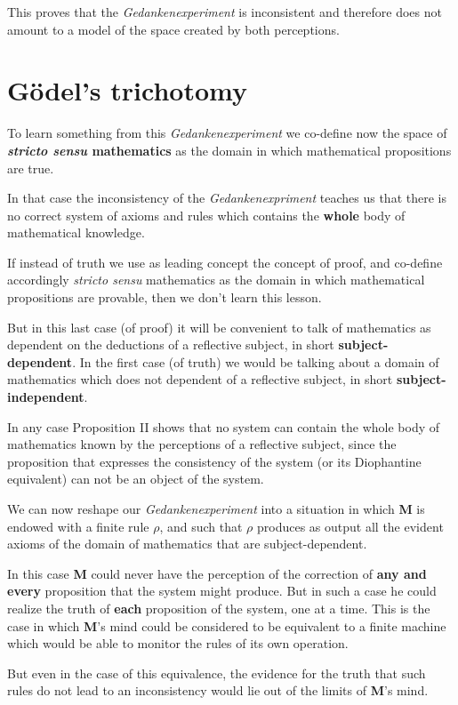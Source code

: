 \documentclass[12pt]{article}
\begin{document}
This proves that the \emph{Gedankenexperiment} is inconsistent and therefore does not amount to a model of the space created by both perceptions.

\section{G\"{o}del's trichotomy}

To learn something from this \emph{Gedankenexperiment} we co-define now the space of \textbf{\emph{stricto sensu} mathematics} as the domain in which mathematical propositions are true.

In that case the inconsistency of the \emph{Gedankenexpriment} teaches us that there is no correct system of axioms and rules which contains the \textbf{whole} body of mathematical knowledge.

If instead of truth we use as leading concept the concept of proof, and co-define accordingly \emph{stricto sensu} mathematics as the domain in which mathematical propositions are provable, then we don't learn this lesson.

But in this last case (of proof) it will be convenient to talk of mathematics as dependent on the deductions of a reflective subject, in short \textbf{subject-dependent}. In the first case (of truth) we would be talking about a domain of mathematics which does not dependent of a reflective subject, in short \textbf{subject-independent}.

In any case Proposition II shows that no system can contain the whole body of mathematics known by the perceptions of a reflective subject, since the proposition that expresses the consistency of the system (or its Diophantine equivalent) can not be an object of the system.

We can now reshape our \emph{Gedankenexperiment} into a situation in which \textbf{M} is endowed with a finite rule $\rho$, and such that $\rho$ produces as output all the evident axioms of the domain of mathematics that are subject-dependent.

In this case \textbf{M} could never have the perception of the correction of \textbf{any and every} proposition that the system might produce. But in such a case he could realize the truth of \textbf{each} proposition of the system, one at a time. This is the case in which \textbf{M}'s mind could be considered to be equivalent to a finite machine which would be able to monitor the rules of its own operation.

But even in the case of this equivalence, the evidence for the truth that such rules do not lead to an inconsistency would lie out of the limits of \textbf{M}'s mind.
\end{document}
